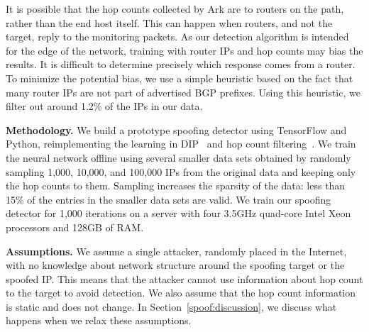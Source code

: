 It is possible that the hop counts collected by Ark are to routers on the path, rather than the end host itself. This can happen when routers, and not the target, reply to the monitoring packets. As our detection algorithm is intended for the edge of the network, training with router IPs and hop counts may bias the results. It is difficult to determine precisely which response comes from a router. To minimize the potential bias, we use a simple heuristic based on the fact that many router IPs are not part of advertised BGP prefixes. Using this heuristic, we filter out around 1.2\% of the IPs in our data.
%




{\bf Methodology.} We build a prototype spoofing detector using TensorFlow and Python, reimplementing the learning in DIP~\citep{dip} and hop count filtering~\citep{hcf}. We train the neural network offline using several smaller data sets obtained by randomly sampling 1,000, 10,000, and 100,000 IPs from the original data and keeping only the hop counts to them. Sampling increases the sparsity of the data: less than 15\% of the entries in the smaller data sets are valid. 
%
%
%
We train our spoofing detector for 1,000 iterations on a server with four 3.5GHz quad-core Intel Xeon processors and 128GB of RAM.
%




{\bf Assumptions.} We assume a single attacker, randomly placed in the Internet, with no knowledge about network structure around the spoofing target or the spoofed IP. This means that the attacker cannot use information about hop count to the target to avoid detection. We also assume that the hop count information is static and does not change. In Section~\ref{spoof:discussion}, we discuss what happens when we relax these assumptions. 

